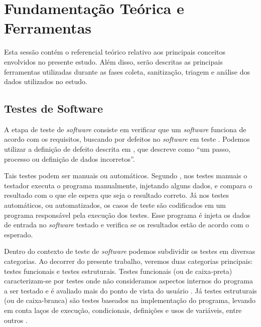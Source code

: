 \documentclass[11.5pt]{article}
\begin{document}


\section{Fundamentação Teórica e Ferramentas}

Esta sessão contém o referencial teórico relativo aos principais conceitos envolvidos no presente
estudo.
Além disso, serão descritas as principais ferramentas utilizadas durante as fases coleta,
sanitização, triagem e análise dos dados utilizados no estudo.


\subsection{Testes de Software}

A etapa de teste de \textit{software} consiste em verificar que um \textit{software} funciona de
acordo com os requisitos, buscando por defeitos no \textit{software} em teste
\cite{engSwSommerville}.
Podemos utilizar a definição de defeito descrita em \cite{introTeste}, que descreve como ``um passo,
processo ou definição de dados incorretos''.

Tais testes podem ser manuais ou automáticos.
Segundo \cite{engSwSommerville}, nos testes manuais o testador executa o programa manualmente,
injetando alguns dados, e compara o resultado com o que ele espera que seja o resultado correto.
Já nos testes automáticos, ou automatizados, os casos de teste são codificados em um programa
responsável pela execução dos testes.
Esse programa é injeta os dados de entrada no \textit{software} testado e verifica se os resultados
estão de acordo com o esperado.

Dentro do contexto de teste de \textit{software} podemos subdividir os testes em diversas
categorias. Ao decorrer do presente trabalho, veremos duas categorias principais: testes funcionais
e testes estruturais.
Testes funcionais (ou de caixa-preta) caracterizam-se por testes onde não consideramos aspectos
internos do programa a ser testado e é avaliado mais do ponto de vista do usuário \cite{introTeste}.
Já testes estruturais (ou de caixa-branca) são testes baseados na implementação do programa, levando
em conta laços de execução, condicionais, definições e usos de variáveis, entre outros
\cite{introTeste}.
\end{document}
